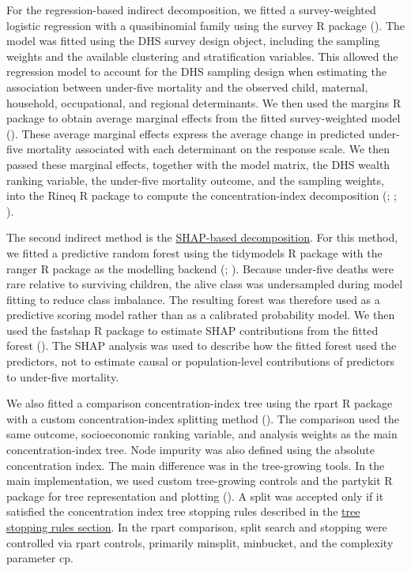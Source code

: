 \documentclass[
  11pt,
  a4paper,
]{article}
\begin{document}
For the regression-based indirect decomposition, we fitted a
survey-weighted logistic regression with a quasibinomial family using
the survey R package (). The
model was fitted using the DHS survey design object, including the
sampling weights and the available clustering and stratification
variables. This allowed the regression model to account for the DHS
sampling design when estimating the association between under-five
mortality and the observed child, maternal, household, occupational, and
regional determinants. We then used the margins R package to obtain
average marginal effects from the fitted survey-weighted model
(). These average
marginal effects express the average change in predicted under-five
mortality associated with each determinant on the response scale. We
then passed these marginal effects, together with the model matrix, the
DHS wealth ranking variable, the under-five mortality outcome, and the
sampling weights, into the Rineq R package to compute the
concentration-index decomposition
(; ; ).

The second indirect method is the
\hyperref[sec-shap-decomposition-definition]{SHAP-based decomposition}.
For this method, we fitted a predictive random forest using the
tidymodels R package with the ranger R package as the modelling backend
(;
). Because
under-five deaths were rare relative to surviving children, the alive
class was undersampled during model fitting to reduce class imbalance.
The resulting forest was therefore used as a predictive scoring model
rather than as a calibrated probability model. We then used the fastshap
R package to estimate SHAP contributions from the fitted forest
(). The SHAP analysis was
used to describe how the fitted forest used the predictors, not to
estimate causal or population-level contributions of predictors to
under-five mortality.

We also fitted a comparison concentration-index tree using the rpart R
package with a custom concentration-index splitting method
(). The comparison
used the same outcome, socioeconomic ranking variable, and analysis
weights as the main concentration-index tree. Node impurity was also
defined using the absolute concentration index. The main difference was
in the tree-growing tools. In the main implementation, we used custom
tree-growing controls and the partykit R package for tree representation
and plotting (). A split was accepted only if it satisfied the concentration
index tree stopping rules described in the
\hyperref[sec-stopping-rules]{tree stopping rules section}. In the rpart
comparison, split search and stopping were controlled via rpart
controls, primarily minsplit, minbucket, and the complexity parameter
cp.~
\end{document}
